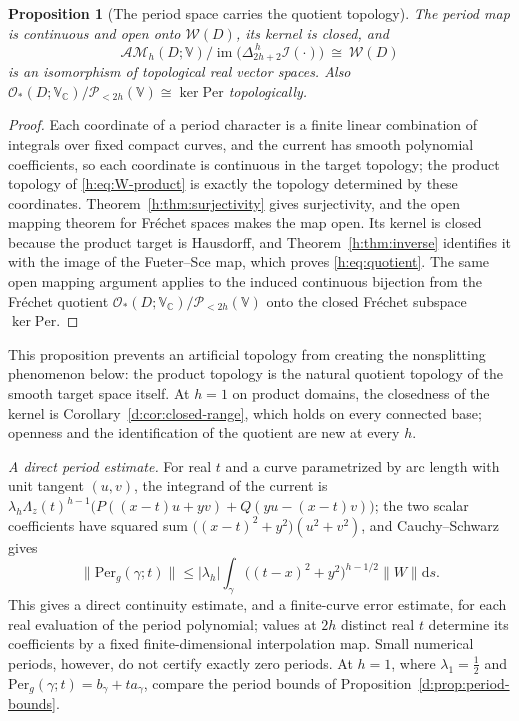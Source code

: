 \documentclass[11pt,a4paper]{article}
\numberwithin{equation}{section}
\newtheorem{proposition}[theorem]{Proposition}
\theoremstyle{definition}
\theoremstyle{remark}
\theoremstyle{plain}
\newcommand{\CC}{\mathbb C}
\newcommand{\I}{\mathcal I}
\newcommand{\AM}{\mathcal{AM}}
\newcommand{\Per}{\mathrm{Per}}
\newcommand{\abs}[1]{\lvert #1\rvert}
\newcommand{\norm}[1]{\lVert #1\rVert}
\newcommand{\dd}{\mathrm d}
\newcommand{\lapH}{\Delta_{2h+2}^{\,h}}
\newcommand{\VV}{\mathbb V}                       %
\newcommand{\VC}{\mathbb V_{\CC}}                 %
\newcommand{\PolH}{\mathscr P_{<2h}(\VV)}
\newcommand{\Rq}{\Lambda}                         %
\begin{document}
\begin{proposition}[The period space carries the quotient topology]
\label{h:prop:quotient}
The period map is continuous and open onto $\mathscr W(D)$, its kernel is
closed, and
\begin{equation}\label{h:eq:quotient}
 \AM_h(D;\VV)\big/\operatorname{im}\bigl(\lapH\I(\cdot)\bigr)\ \cong\
 \mathscr W(D)
\end{equation}
is an isomorphism of topological real vector spaces. Also
$\mathcal O_*(D;\VC)/\PolH\cong\ker\Per$ topologically.
\end{proposition}

\begin{proof}
Each coordinate of a period character is a finite linear combination of
integrals over fixed compact curves, and the current has smooth polynomial
coefficients, so each coordinate is continuous in the target topology; the
product topology of \eqref{h:eq:W-product} is exactly the topology determined
by these coordinates. Theorem~\ref{h:thm:surjectivity} gives surjectivity, and
the open mapping theorem for Fr\'echet spaces makes the map open. Its kernel is
closed because the product target is Hausdorff, and
Theorem~\ref{h:thm:inverse} identifies it with the image of the Fueter--Sce
map, which proves \eqref{h:eq:quotient}. The same open mapping argument applies
to the induced continuous bijection from the Fr\'echet quotient
$\mathcal O_*(D;\VC)/\PolH$ onto the closed Fr\'echet subspace $\ker\Per$.
\end{proof}

This proposition prevents an artificial topology from creating the
nonsplitting phenomenon below: the product topology is the natural quotient
topology of the smooth target space itself. At $h=1$ on product domains, the
closedness of the kernel is Corollary~\ref{d:cor:closed-range}, which holds on
every connected base; openness and the identification of the quotient are new
at every $h$.

\emph{A direct period estimate.} For real $t$ and a curve parametrized by arc
length with unit tangent $(u,v)$, the integrand of the current is
$\lambda_h\Rq_z(t)^{h-1}\bigl(P((x-t)u+yv)+Q(yu-(x-t)v)\bigr)$; the two scalar
coefficients have squared sum $\bigl((x-t)^2+y^2\bigr)(u^2+v^2)$, and
Cauchy--Schwarz gives
\begin{equation}\label{h:eq:period-bound}
 \norm{\Per_g(\gamma;t)}\le\abs{\lambda_h}\int_\gamma
 \bigl((t-x)^2+y^2\bigr)^{h-1/2}\norm W\dd s .
\end{equation}
This gives a direct continuity estimate, and a finite-curve error estimate, for
each real evaluation of the period polynomial; values at $2h$ distinct real $t$
determine its coefficients by a fixed finite-dimensional interpolation map.
Small numerical periods, however, do not certify exactly zero periods. At $h=1$,
where $\lambda_1=\tfrac12$ and $\Per_g(\gamma;t)=b_\gamma+ta_\gamma$, compare
the period bounds of Proposition~\ref{d:prop:period-bounds}.
\end{document}
